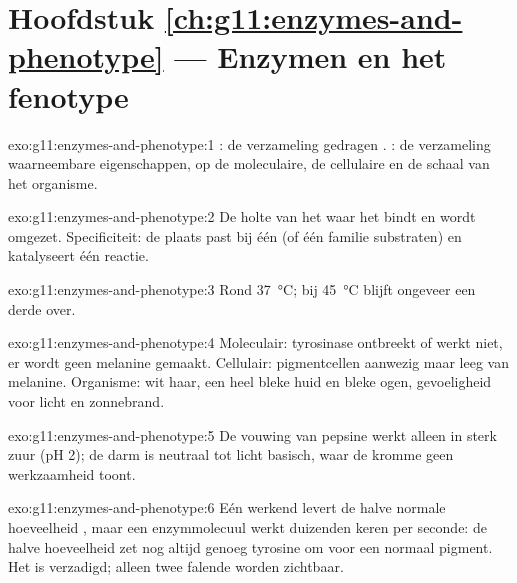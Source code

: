 \section*{Hoofdstuk \ref{ch:g11:enzymes-and-phenotype} --- Enzymen en het fenotype}

\begin{solution}{exo:g11:enzymes-and-phenotype:1}
: de verzameling gedragen . : de verzameling
waarneembare eigenschappen, op de moleculaire, de cellulaire en de schaal
van het organisme.
\end{solution}

\begin{solution}{exo:g11:enzymes-and-phenotype:2}
De holte van het  waar het  bindt en wordt omgezet.
Specificiteit: de plaats past bij één  (of één familie
substraten) en katalyseert één reactie.
\end{solution}

\begin{solution}{exo:g11:enzymes-and-phenotype:3}
Rond \qty{37}{\celsius}; bij \qty{45}{\celsius} blijft ongeveer een derde over.
\end{solution}

\begin{solution}{exo:g11:enzymes-and-phenotype:4}
Moleculair: tyrosinase ontbreekt of werkt niet, er wordt geen melanine
gemaakt. Cellulair: pigmentcellen aanwezig maar leeg van melanine.
Organisme: wit haar, een heel bleke huid en bleke ogen, gevoeligheid voor
licht en zonnebrand.
\end{solution}

\begin{solution}{exo:g11:enzymes-and-phenotype:5}
De vouwing van pepsine werkt alleen in sterk zuur (pH 2); de darm is
neutraal tot licht basisch, waar de kromme geen werkzaamheid toont.
\end{solution}

\begin{solution}{exo:g11:enzymes-and-phenotype:6}
Eén werkend  levert de halve normale hoeveelheid , maar een
enzymmolecuul werkt duizenden keren per seconde: de halve hoeveelheid zet
nog altijd genoeg tyrosine om voor een normaal pigment. Het  is
verzadigd; alleen twee falende  worden zichtbaar.
\end{solution}

